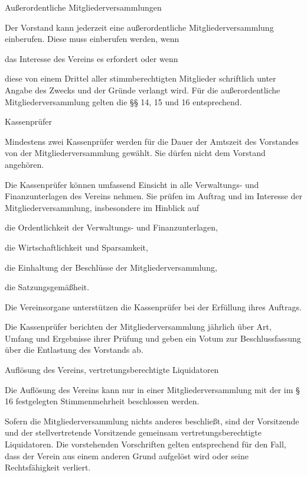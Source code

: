 \begin{para}{Außerordentliche Mitgliederversammlungen}
	\item Der Vorstand kann jederzeit eine außerordentliche Mitgliederversammlung einberufen. Diese muss einberufen werden, wenn
	\begin{subpara}
		\item das Interesse des Vereins es erfordert oder wenn
		\item diese von einem Drittel aller stimmberechtigten Mitglieder schriftlich unter Angabe des Zwecks und der Gründe verlangt wird.
		Für die außerordentliche Mitgliederversammlung gelten die §§ 14, 15 und 16 entsprechend.
	\end{subpara}
\end{para}

\begin{para}{Kassenprüfer}
	\item Mindestens zwei Kassenprüfer werden für die Dauer der Amtszeit des Vorstandes von der Mitgliederversammlung gewählt. Sie dürfen nicht dem Vorstand angehören.
	\item Die Kassenprüfer können umfassend Einsicht in alle Verwaltungs- und Finanzunterlagen des Vereins nehmen. Sie prüfen im Auftrag und im Interesse der Mitgliederversammlung, insbesondere im Hinblick auf
	\begin{subpara}
		\item die Ordentlichkeit der Verwaltungs- und Finanzunterlagen,
		\item die Wirtschaftlichkeit und Sparsamkeit,
		\item die Einhaltung der Beschlüsse der Mitgliederversammlung,
		\item die Satzungsgemäßheit.
	\end{subpara}
	\item Die Vereinsorgane unterstützen die Kassenprüfer bei der Erfüllung ihres Auftrags.
	\item Die Kassenprüfer berichten der Mitgliederversammlung jährlich über Art, Umfang und Ergebnisse ihrer Prüfung und geben ein Votum zur Beschlussfassung über die Entlastung des Vorstands ab.
\end{para}

\begin{para}{Auflösung des Vereins, vertretungsberechtigte Liquidatoren}
	\item Die Auflösung des Vereins kann nur in einer Mitgliederversammlung mit der im § 16 festgelegten Stimmenmehrheit beschlossen werden. 
	\item Sofern die Mitgliederversammlung nichts anderes beschließt, sind der Vorsitzende und der stellvertretende Vorsitzende gemeinsam vertretungs\-be\-rech\-tigte Liquidatoren. 
	Die vorstehenden Vorschriften gelten entsprechend für den Fall, dass der Verein aus einem anderen Grund aufgelöst wird oder seine Rechtsfähigkeit verliert.
\end{para}

